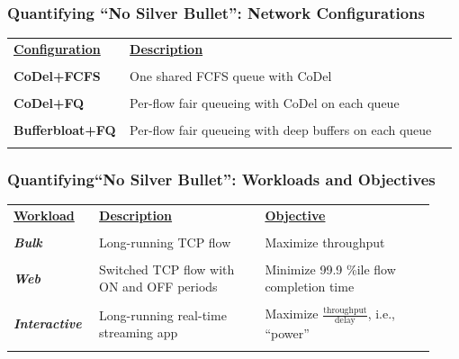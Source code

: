 \begin{frame}[plain]
\frametitle{Quantifying ``No Silver Bullet'': Network Configurations}
\begin{table}
\begin{tabular}{|p{0.25\linewidth}|p{0.73\linewidth}|}
\hline
{\bf \underline{Configuration}} & {\bf \underline{Description}} \\
&\\
{\bf CoDel+FCFS} & One shared FCFS queue with CoDel\\
& \\
{\bf CoDel+FQ} & Per-flow fair queueing with CoDel on each queue\\ 
&\\
{\bf Bufferbloat+FQ} & Per-flow fair queueing with deep buffers on
each queue\\ 
& \\
\hline
\end{tabular}
\end{table}
\end{frame}

\begin{frame}[plain]
\frametitle{Quantifying``No Silver Bullet'': Workloads and Objectives}

\begin{table}
\begin{tabular}{|p{0.18\linewidth}|p{0.37\linewidth}|p{0.38\linewidth}|}
\hline
{\bf \underline{Workload}} & {\bf \underline{Description}} & {\bf \underline{Objective}} \\
& &\\
\textbf{\emph{Bulk}} & Long-running TCP flow & Maximize throughput \\
& &\\
\textbf{\emph{Web}} & Switched TCP flow with ON and OFF periods &
Minimize 99.9 \%ile flow completion time \\
& &\\
\textbf{\emph{Interactive}} & Long-running real-time
streaming app & Maximize $\frac{\mbox{throughput}}{\mbox{delay}}$, i.e.,
  ``power'' \\ 
& &\\
\hline
\end{tabular}
\end{table}
\end{frame}


